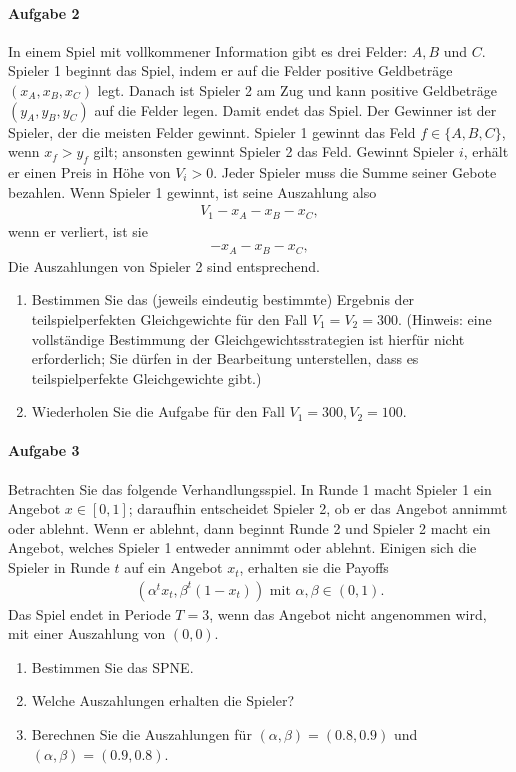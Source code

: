 \paragraph{Aufgabe 2}%
\label{par:serie_8_aufgabe_2}

In einem Spiel mit vollkommener Information gibt es drei Felder: $A, B$ und $C$.
Spieler 1 beginnt das Spiel, indem er auf die Felder positive Geldbeträge
$(x_A, x_B, x_C)$ legt.
Danach ist Spieler 2 am Zug und kann positive Geldbeträge $(y_A, y_B, y_C)$ auf die Felder
legen.
Damit endet das Spiel.
Der Gewinner ist der Spieler, der die meisten Felder gewinnt.
Spieler 1 gewinnt das Feld $f \in \{A,B,C\}$, wenn $x_f > y_f$ gilt;
ansonsten gewinnt Spieler 2 das Feld.
Gewinnt Spieler $i$, erhält er einen Preis in Höhe von $V_i > 0$.
Jeder Spieler muss die Summe seiner Gebote bezahlen.
Wenn Spieler 1 gewinnt, ist seine Auszahlung also
\begin{align*}
  V_1 - x_A - x_B - x_C,
\end{align*}
wenn er verliert, ist sie
\begin{align*}
  - x_A - x_B - x_C,
\end{align*}
Die Auszahlungen von Spieler 2 sind entsprechend.

\begin{enumerate}
  \item Bestimmen Sie das (jeweils eindeutig bestimmte) Ergebnis der teilspielperfekten
    Gleichgewichte für den Fall $V_1 = V_2 = 300$.
    (Hinweis: eine vollständige Bestimmung der Gleichgewichtsstrategien ist hierfür nicht
    erforderlich; Sie dürfen in der Bearbeitung unterstellen, dass es teilspielperfekte
    Gleichgewichte gibt.)
  \item Wiederholen Sie die Aufgabe für den Fall $V_1 = 300, V_2 = 100$.
\end{enumerate}

\paragraph{Aufgabe 3}%
\label{par:serie_8_aufgabe_3}

Betrachten Sie das folgende Verhandlungsspiel.
In Runde 1 macht Spieler 1 ein Angebot $x \in [0, 1]$; daraufhin entscheidet Spieler 2, ob
er das Angebot annimmt oder ablehnt.
Wenn er ablehnt, dann beginnt Runde 2 und Spieler 2 macht ein Angebot, welches Spieler 1
entweder annimmt oder ablehnt.
Einigen sich die Spieler in Runde $t$ auf ein Angebot $x_t$, erhalten sie die Payoffs
\begin{align*}
  (\alpha^t x_t, \beta^t (1-x_t)) \text{ mit $\alpha, \beta \in (0,1)$.}
\end{align*}
Das Spiel endet in Periode $T=3$, wenn das Angebot nicht angenommen wird, mit einer
Auszahlung von $(0,0)$.

\begin{enumerate}
  \item Bestimmen Sie das SPNE.
  \item Welche Auszahlungen erhalten die Spieler?
  \item Berechnen Sie die Auszahlungen für
    $(\alpha, \beta) = (0.8, 0.9)$ und
    $(\alpha, \beta) = (0.9, 0.8)$.
\end{enumerate}
